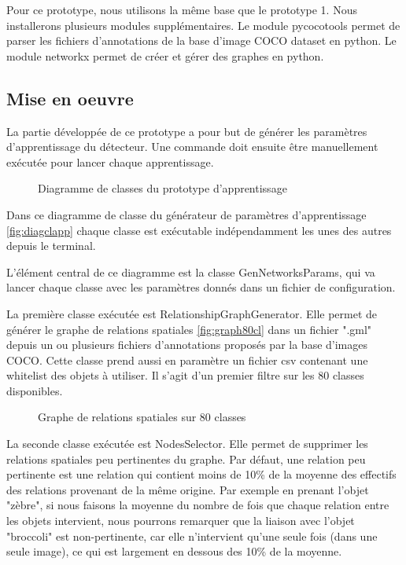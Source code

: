 \documentclass[debug,nodate,hideweeklyreports]{polytech/polytech}
\begin{document}
Pour ce prototype, nous utilisons la même base que le prototype 1. Nous installerons plusieurs modules supplémentaires.
Le module pycocotools permet de parser les fichiers d'annotations de la base d'image COCO dataset en python.
Le module networkx permet de créer et gérer des graphes en python.

\subsection{Mise en oeuvre}

La partie développée de ce prototype a pour but de générer les paramètres d'apprentissage du détecteur. Une commande doit ensuite être manuellement exécutée pour lancer chaque apprentissage.

\begin{figure}
  \caption{Diagramme de classes du prototype d'apprentissage}
  \label{fig:diagclapp}
\end{figure}

Dans ce diagramme de classe du générateur de paramètres d'apprentissage \autoref{fig:diagclapp} chaque classe est exécutable indépendamment les unes des autres depuis le terminal.

L'élément central de ce diagramme est la classe GenNetworksParams, qui va lancer chaque classe avec les paramètres donnés dans un fichier de configuration.

La première classe exécutée est RelationshipGraphGenerator. Elle permet de générer le graphe de relations spatiales \autoref{fig:graph80cl} dans un fichier ".gml" depuis un ou plusieurs fichiers d'annotations proposés par la base d'images COCO. Cette classe prend aussi en paramètre un fichier csv contenant une whitelist des objets à utiliser. Il s'agit d'un premier filtre sur les 80 classes disponibles.

\begin{figure}
  \caption{Graphe de relations spatiales sur 80 classes}
  \label{fig:graph80cl}
\end{figure}

La seconde classe exécutée est NodesSelector. Elle permet de supprimer les relations spatiales peu pertinentes du graphe. Par défaut, une relation peu pertinente est une relation qui contient moins de 10\% de la moyenne des effectifs des relations provenant de la même origine. 
Par exemple en prenant l'objet "zèbre", si nous faisons la moyenne du nombre de fois que chaque relation entre les objets intervient, nous pourrons remarquer que la liaison avec l'objet "broccoli" est non-pertinente, car elle n'intervient qu'une seule fois (dans une seule image), ce qui est largement en dessous des 10\% de la moyenne.
\end{document}
